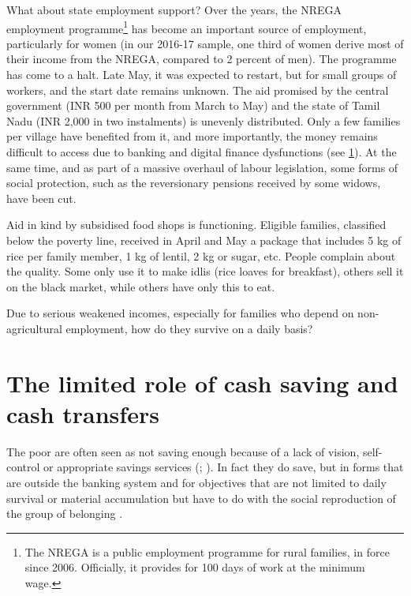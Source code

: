 \documentclass[a4paper, 11pt, onecolumn]{article}
\begin{document}
What about state employment support? Over the years, the NREGA employment programme\footnote{The NREGA is a public employment programme for rural families, in force since 2006. Officially, it provides for 100 days of work at the minimum wage.} has become an important source of employment, particularly for women (in our 2016-17 sample, one third of women derive most of their income from the NREGA, compared to 2 percent of men). 
The programme has come to a halt. 
Late May, it was expected to restart, but for small groups of workers, and the start date remains unknown. 
The aid promised by the central government (INR 500 per month from March to May) and the state of Tamil Nadu (INR 2,000 in two instalments) is unevenly distributed. 
Only a few families per village have benefited from it, and more importantly, the money remains difficult to access due to banking and digital finance dysfunctions (see \ref{section:saving}). 
At the same time, and as part of a massive overhaul of labour legislation, some forms of social protection, such as the reversionary pensions received by some widows, have been cut.

Aid in kind by subsidised food shops is functioning.
Eligible families, classified below the poverty line, received in April and May a package that includes 5 kg of rice per family member, 1 kg of lentil, 2 kg or sugar, etc. 
People complain about the quality.
Some only use it to make idlis (rice loaves for breakfast), others sell it on the black market, while others have only this to eat.

Due to serious weakened incomes, especially for families who depend on non-agricultural employment, how do they survive on a daily basis? 

\section{The limited role of cash saving and cash transfers}
\label{section:saving}

The poor are often seen as not saving enough because of a lack of vision, self-control or appropriate savings services (\citealp[pp. 183--204]{Banerjee2011}; \citealp{Karlan2014}).
In fact they do save, but in forms that are outside the banking system \citep{Collins2009, Rutherford2000, Peebles2014, Peebles2020, Goedecke2017, Guerin2019} and for objectives that are not limited to daily survival or material accumulation but have to do with the social reproduction of the group of belonging \citep{Peebles2014, Douglas1980}.
\end{document}
